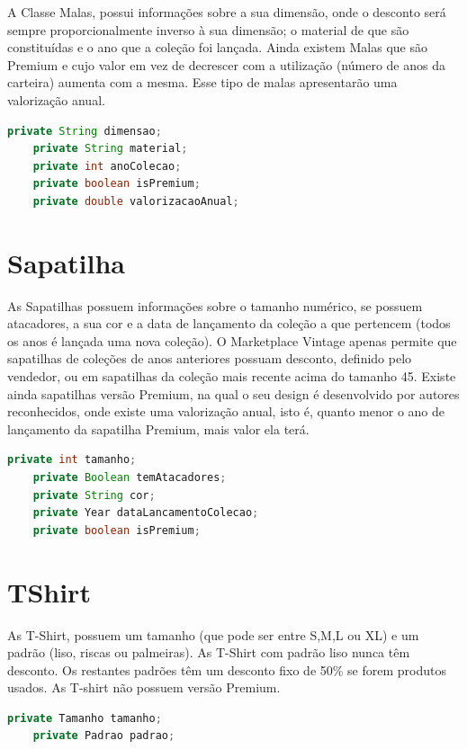 \documentclass[a4paper]{report}
\begin{document}
    A Classe Malas, possui informações sobre a sua dimensão, onde o desconto será sempre proporcionalmente inverso à sua dimensão; o material de que são constituídas e o ano que a coleção foi lançada. Ainda existem Malas que são Premium e cujo valor em vez de decrescer com a utilização (número de anos da carteira) aumenta com a mesma. Esse tipo de malas apresentarão uma valorização anual.

    \begin{lstlisting}[language=java]
    private String dimensao;
    private String material;
    private int anoColecao;
    private boolean isPremium;
    private double valorizacaoAnual;
    \end{lstlisting}

    \section{Sapatilha}
    
    As Sapatilhas possuem informações sobre o tamanho numérico, se possuem atacadores, a sua cor e a data de lançamento da coleção a que pertencem (todos os anos é lançada uma nova coleção). O Marketplace Vintage apenas permite que sapatilhas de coleções de anos anteriores possuam desconto, definido pelo vendedor, ou em sapatilhas da coleção mais recente acima do tamanho 45. Existe ainda sapatilhas versão Premium, na qual o seu design é desenvolvido por autores reconhecidos, onde existe uma valorização anual, isto é, quanto menor o ano de lançamento da sapatilha Premium, mais valor ela terá.

    \begin{lstlisting}[language=java]
    private int tamanho;
    private Boolean temAtacadores;
    private String cor;
    private Year dataLancamentoColecao;
    private boolean isPremium;
    \end{lstlisting}

    \section{TShirt}
    
     As T-Shirt, possuem um tamanho (que pode ser entre S,M,L ou XL) e um padrão (liso, riscas ou palmeiras). As T-Shirt com padrão liso nunca têm desconto. Os restantes padrões têm um desconto fixo de 50\% se forem produtos usados. As T-shirt não possuem versão Premium.
     
    \begin{lstlisting}[language=java]
    private Tamanho tamanho;
    private Padrao padrao; 
    \end{lstlisting}
\end{document}
